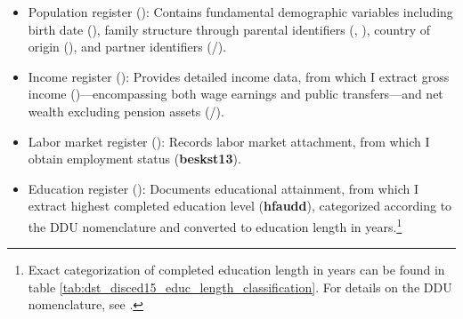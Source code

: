 \documentclass[main.tex]{subfiles}
\begin{document}
\begin{itemize}
    \item Population register (): Contains fundamental demographic variables including birth date (), family structure through parental identifiers (, ), country of origin (), and partner identifiers (/).
    
    \item Income register (): Provides detailed income data, from which I extract gross income ()—encompassing both wage earnings and public transfers—and net wealth excluding pension assets (/).
    
    \item Labor market register (): Records labor market attachment, from which I obtain employment status (\textbf{beskst13}).
    
    \item Education register (): Documents educational attainment, from which I extract highest completed education level (\textbf{hfaudd}), categorized according to the DDU nomenclature and converted to education length in years.\footnote{Exact categorization of completed education length in years can be found in table \ref{tab:dst_disced15_educ_length_classification}. For details on the DDU nomenclature, see \textcite{dst_ddu_edu}.}
\end{itemize}
\end{document}
